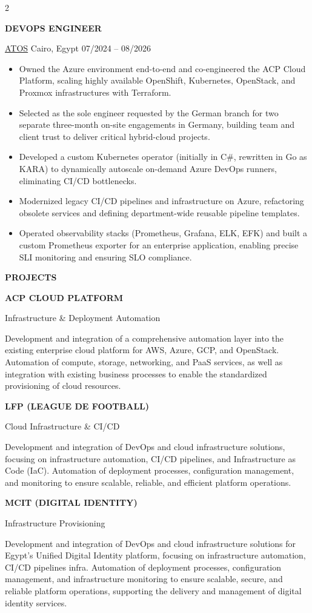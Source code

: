 \documentclass[9pt, a4paper]{extarticle}
\newcommand{\cvsectionright}[1]{
    \vspace{1ex}
    {\Large\bfseries\textcolor{textwhite}{\uppercase{#1}}}\par\vspace{2ex}
    \color{textlight}
}
\newcommand{\cvevent}[3]{
    \vspace*{1ex}
    \noindent\makebox[0pt][l]{\hspace*{-\dimexpr 0.5\columnsep \relax}\makebox[0pt][c]{\tikz\filldraw[textwhite] (0,0) circle (2.5pt);}}%
    {\large\bfseries\textcolor{textwhite}{\uppercase{#1}}}\par\vspace{0.5ex}
    {\small\textcolor{textlight}{#2}}\par\vspace{1ex}
    {\small\textcolor{textlight}{#3}}\par\vspace{3ex}
}
\begin{document}
\begin{paracol}{2}
	\cvevent{DevOps Engineer}{\href{https://atos.net}{ATOS} \textbar{} Cairo, Egypt \textbar{} 07/2024 -- 08/2026}{
		\begin{itemize}
			\item Owned the Azure environment end-to-end and co-engineered the ACP Cloud Platform, scaling highly available OpenShift, Kubernetes, OpenStack, and Proxmox infrastructures with Terraform.
			\item Selected as the sole engineer requested by the German branch for two separate three-month on-site engagements in Germany, building team and client trust to deliver critical hybrid-cloud projects.
			\item Developed a custom Kubernetes operator (initially in C\#, rewritten in Go as KARA) to dynamically autoscale on-demand Azure DevOps runners, eliminating CI/CD bottlenecks.
			\item Modernized legacy CI/CD pipelines and infrastructure on Azure, refactoring obsolete services and defining department-wide reusable pipeline templates.
			\item Operated observability stacks (Prometheus, Grafana, ELK, EFK) and built a custom Prometheus exporter for an enterprise application, enabling precise SLI monitoring and ensuring SLO compliance.
		\end{itemize}
	}

	\cvsectionright{Projects}

	\cvevent{ACP Cloud Platform}{Infrastructure \& Deployment Automation}{
		Development and integration of a comprehensive automation layer into the existing enterprise cloud platform for AWS, Azure, GCP, and OpenStack. Automation of compute, storage, networking, and PaaS services, as well as integration with existing business processes to enable the standardized provisioning of cloud resources.
	}

	\cvevent{LFP (League de Football)}{Cloud Infrastructure \& CI/CD}{
		Development and integration of DevOps and cloud infrastructure solutions, focusing on infrastructure automation, CI/CD pipelines, and Infrastructure as Code (IaC). Automation of deployment processes, configuration management, and monitoring to ensure scalable, reliable, and efficient platform operations.
	}

	\cvevent{MCIT (Digital Identity)}{Infrastructure Provisioning}{
		Development and integration of DevOps and cloud infrastructure solutions for Egypt's Unified Digital Identity platform, focusing on infrastructure automation, CI/CD pipelines infra. Automation of deployment processes, configuration management, and infrastructure monitoring to ensure scalable, secure, and reliable platform operations, supporting the delivery and management of digital identity services.
	}


\end{paracol}
\end{document}
